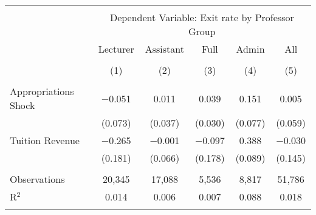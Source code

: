 
\begin{tabular}{@{\extracolsep{5pt}}lccccc} 
\\[-1.8ex]\hline 
\hline \\[-1.8ex] 
 & \multicolumn{5}{c}{Dependent Variable: Exit rate by Professor Group} \\ 
\cline{2-6} 
 & Lecturer & Assistant & Full & Admin & All \\ 
\\[-1.8ex] & (1) & (2) & (3) & (4) & (5)\\ 
\hline \\[-1.8ex] 
 Appropriations Shock & $-$0.051 & 0.011 & 0.039 & 0.151 & 0.005 \\ 
  & (0.073) & (0.037) & (0.030) & (0.077) & (0.059) \\ 
  Tuition Revenue & $-$0.265 & $-$0.001 & $-$0.097 & 0.388 & $-$0.030 \\ 
  & (0.181) & (0.066) & (0.178) & (0.089) & (0.145) \\ 
 \hline \\[-1.8ex] 
Observations & 20,345 & 17,088 & 5,536 & 8,817 & 51,786 \\ 
R$^{2}$ & 0.014 & 0.006 & 0.007 & 0.088 & 0.018 \\ 
\hline 
\hline \\[-1.8ex] 
\end{tabular} 
